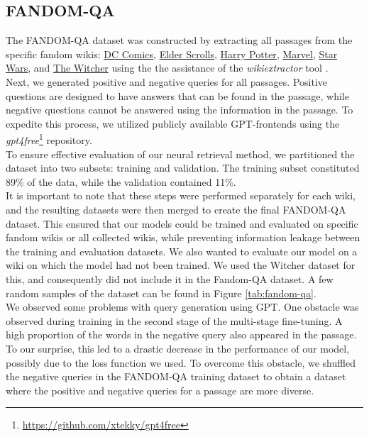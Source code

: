 \documentclass[11pt]{article}
\begin{document}
\subsection{FANDOM-QA}
The FANDOM-QA dataset was constructed by extracting all passages from the specific fandom wikis: \href{https://dc.fandom.com}{DC Comics}, \href{https://elderscrolls.fandom.com}{Elder Scrolls}, \href{https://harrypotter.fandom.com}{Harry Potter}, \href{https://marvel.fandom.com}{Marvel}, \href{https://starwars.fandom.com}{Star Wars}, and \href{https://witcher.fandom.com}{The Witcher} using the the assistance of the \textit{wikiextractor} tool \cite{Wikiextractor2015}. \\
Next, we generated positive and negative queries for all passages. Positive questions are designed to have answers that can be found in the passage, while negative questions cannot be answered using the information in the passage. To expedite this process, we utilized publicly available GPT-frontends using the \textit{gpt4free}\footnote{\url{https://github.com/xtekky/gpt4free}} repository. \\
To ensure effective evaluation of our neural retrieval method, we partitioned the dataset into two subsets: training and validation. The training subset constituted 89\% of the data, while the validation contained 11\%. \\
It is important to note that these steps were performed separately for each wiki, and the resulting datasets were then merged to create the final FANDOM-QA dataset. This ensured that our models could be trained and evaluated on specific fandom wikis or all collected wikis, while preventing information leakage between the training and evaluation datasets. 
We also wanted to evaluate our model on a wiki on which the model had not been trained. We used the Witcher dataset for this, and consequently did not include it in the Fandom-QA dataset. A few random samples of the dataset can be found in Figure \ref{tab:fandom-qa}.\\
We observed some problems with query generation using GPT. One obstacle was observed during training in the second stage of the multi-stage fine-tuning. 
A high proportion of the words in the negative query also appeared in the passage. To our surprise, this led to a drastic decrease in the performance of our model, possibly due to the loss function we used. %
To overcome this obstacle, we shuffled the negative queries in the FANDOM-QA training dataset to obtain a dataset where the positive and negative queries for a passage are more diverse.
\end{document}
